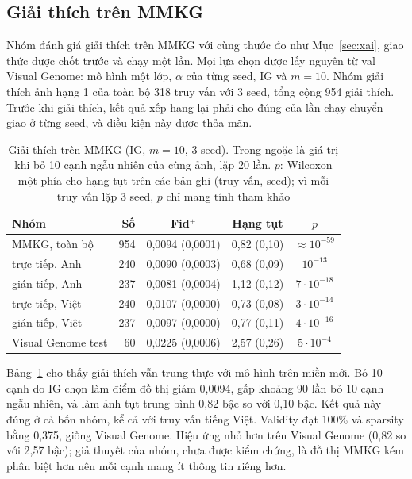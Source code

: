 \subsection{Giải thích trên MMKG}
Nhóm đánh giá giải thích trên MMKG với cùng thước đo như Mục~\ref{sec:xai}, giao thức được chốt trước và chạy một lần. Mọi lựa chọn được lấy nguyên từ val Visual Genome: mô hình một lớp, $\alpha$ của từng seed, IG và $m = 10$. Nhóm giải thích ảnh hạng 1 của toàn bộ 318 truy vấn với 3 seed, tổng cộng 954 giải thích. Trước khi giải thích, kết quả xếp hạng lại phải cho đúng \mrr{} của lần chạy chuyển giao ở từng seed, và điều kiện này được thỏa mãn.

\begin{table}[t]
\centering
\caption{Giải thích trên MMKG (IG, $m = 10$, 3 seed). Trong ngoặc là giá trị khi bỏ 10 cạnh ngẫu nhiên của cùng ảnh, lặp 20 lần. $p$: Wilcoxon một phía cho hạng tụt trên các bản ghi (truy vấn, seed); vì mỗi truy vấn lặp 3 seed, $p$ chỉ mang tính tham khảo}
\label{tab:mmkg-xai}
\scriptsize
\setlength{\tabcolsep}{2.5pt}
\begin{tabular}{@{}l r c c c@{}}
\toprule
\textbf{Nhóm} & \textbf{Số} & \textbf{Fid$^+$} & \textbf{Hạng tụt} & $p$ \\
\midrule
MMKG, toàn bộ & 954 & 0,0094 (0,0001) & 0,82 (0,10) & $\approx 10^{-59}$ \\
\quad trực tiếp, Anh & 240 & 0,0090 (0,0003) & 0,68 (0,09) & $10^{-13}$ \\
\quad gián tiếp, Anh & 237 & 0,0081 (0,0004) & 1,12 (0,12) & $7{\cdot}10^{-18}$ \\
\quad trực tiếp, Việt & 240 & 0,0107 (0,0000) & 0,73 (0,08) & $3{\cdot}10^{-14}$ \\
\quad gián tiếp, Việt & 237 & 0,0097 (0,0000) & 0,77 (0,11) & $4{\cdot}10^{-16}$ \\
\midrule
Visual Genome test & 60 & 0,0225 (0,0006) & 2,57 (0,26) & $5{\cdot}10^{-4}$ \\
\bottomrule
\end{tabular}
\end{table}

Bảng~\ref{tab:mmkg-xai} cho thấy giải thích vẫn trung thực với mô hình trên miền mới. Bỏ 10 cạnh do IG chọn làm điểm đồ thị giảm 0,0094, gấp khoảng 90 lần bỏ 10 cạnh ngẫu nhiên, và làm ảnh tụt trung bình 0,82 bậc so với 0,10 bậc. Kết quả này đúng ở cả bốn nhóm, kể cả với truy vấn tiếng Việt. Validity đạt 100\% và sparsity bằng 0,375, giống Visual Genome. Hiệu ứng nhỏ hơn trên Visual Genome (0,82 so với 2,57 bậc); giả thuyết của nhóm, chưa được kiểm chứng, là đồ thị MMKG kém phân biệt hơn nên mỗi cạnh mang ít thông tin riêng hơn.

